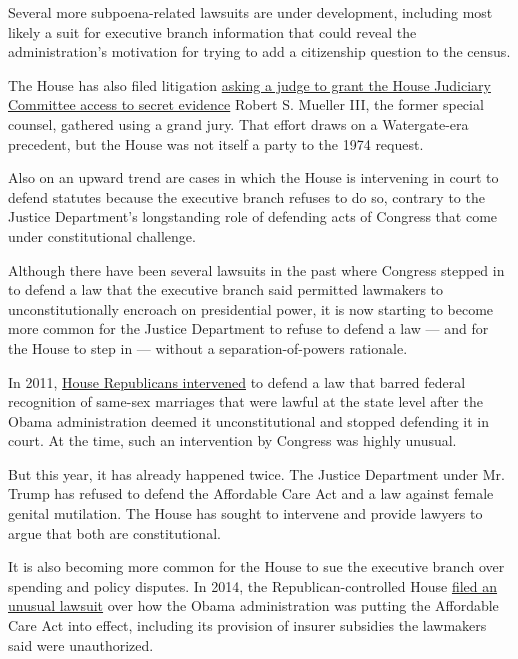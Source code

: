 Several more subpoena-related lawsuits are under development, including
most likely a suit for executive branch information that could reveal
the administration's motivation for trying to add a citizenship question
to the census.

The House has also filed litigation
\href{https://www.nytimes.com/2019/07/26/us/politics/donald-trump-impeachment.html}{asking
a judge to grant the House Judiciary Committee access to secret
evidence} Robert S. Mueller III, the former special counsel, gathered
using a grand jury. That effort draws on a Watergate-era precedent, but
the House was not itself a party to the 1974 request.

Also on an upward trend are cases in which the House is intervening in
court to defend statutes because the executive branch refuses to do so,
contrary to the Justice Department's longstanding role of defending acts
of Congress that come under constitutional challenge.

Although there have been several lawsuits in the past where Congress
stepped in to defend a law that the executive branch said permitted
lawmakers to unconstitutionally encroach on presidential power, it is
now starting to become more common for the Justice Department to refuse
to defend a law --- and for the House to step in --- without a
separation-of-powers rationale.

In 2011,
\href{https://www.nytimes.com/2011/03/05/us/politics/05marriage.html}{House
Republicans intervened} to defend a law that barred federal recognition
of same-sex marriages that were lawful at the state level after the
Obama administration deemed it unconstitutional and stopped defending it
in court. At the time, such an intervention by Congress was highly
unusual.

But this year, it has already happened twice. The Justice Department
under Mr. Trump has refused to defend the Affordable Care Act and a law
against female genital mutilation. The House has sought to intervene and
provide lawyers to argue that both are constitutional.

It is also becoming more common for the House to sue the executive
branch over spending and policy disputes. In 2014, the
Republican-controlled House
\href{https://www.nytimes.com/2014/11/22/us/politics/obamacare-lawsuit-filed-by-republicans.html}{filed
an unusual lawsuit} over how the Obama administration was putting the
Affordable Care Act into effect, including its provision of insurer
subsidies the lawmakers said were unauthorized.

